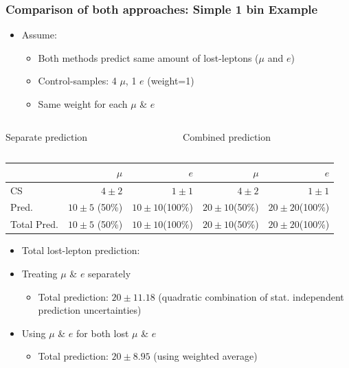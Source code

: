\documentclass{beamer}
\begin{document}
\begin{frame}
  \frametitle{Comparison of both approaches: Simple 1 bin Example}
  \begin{itemize}
   \item Assume:
   \begin{itemize}
    \item Both methods predict same amount of lost-leptons ($\mu$ and $e$)
    \item Control-samples: 4 $\mu$, 1 $e$ (weight=1)
    \item Same weight for each $\mu$ \& $e$ 
   \end{itemize}

  \end{itemize}
  \begin{columns}
   \begin{column}{0.5\textwidth}
   \begin{center}
    Separate prediction
   \end{center}

   \end{column}
   \begin{column}{0.5\textwidth}
    \begin{center}
    Combined prediction
    \end{center}
   \end{column}

  \end{columns}

  \scriptsize
  \begin{tabular}{l|r|r||r|r}

                                                  &           $\mu$            &           $e$  &             $\mu$            &           $e$  \\
\midrule 
     CS &                $4\pm2$ &             $1\pm1$ &              $4\pm2$ &             $1\pm1$  \\ \hline
      Pred.    &          $10\pm5$ (50\%) &              $10\pm10$(100\%)&              $20\pm10$(50\%)&                 $20\pm20$(100\%) \\
      Total Pred. &      $10\pm5$ (50\%) &              $10\pm10$(100\%)&              $20\pm10$(50\%)&                 $20\pm20$(100\%) \\
\bottomrule
\end{tabular}
\small
\begin{itemize}
 \item Total lost-lepton prediction:
 \item Treating $\mu$ \& $e$ separately
 \begin{itemize}
  \item Total prediction: $20\pm11.18$ (quadratic combination of stat. independent prediction uncertainties)
 \end{itemize}
 \item Using $\mu$ \& $e$ for both lost $\mu$ \& $e$
 \begin{itemize}
  \item Total prediction: $20\pm8.95$ (using weighted average)
 \end{itemize}
\end{itemize}
\end{frame}
\end{document}
